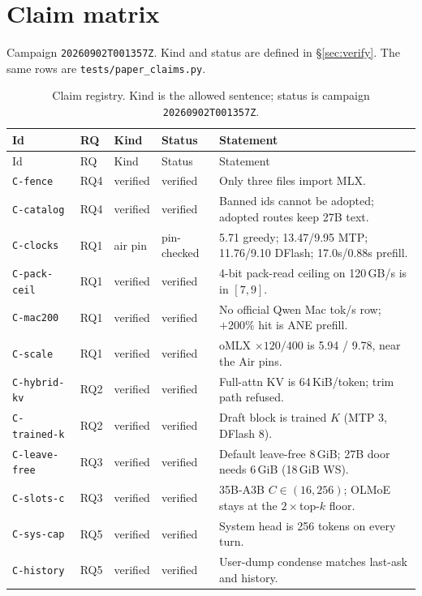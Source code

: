 \section{Claim matrix}
\label{app:claims}

Campaign \texttt{20260902T001357Z}. Kind and status are defined in \S\ref{sec:verify}. The same rows are \texttt{tests/paper\_claims.py}.

{\small
\begin{longtable}{@{}llllp{6.6cm}@{}}
\caption{Claim registry. Kind is the allowed sentence; status is campaign \texttt{20260902T001357Z}.}
\label{tab:claims}\\
\toprule
Id & RQ & Kind & Status & Statement \\
\midrule
\endfirsthead
\toprule
Id & RQ & Kind & Status & Statement \\
\midrule
\endhead
\texttt{C-fence} & RQ4 & verified & verified & Only three files import MLX. \\
\texttt{C-catalog} & RQ4 & verified & verified & Banned ids cannot be adopted; adopted routes keep 27B text. \\
\texttt{C-clocks} & RQ1 & air pin & pin-checked & 5.71 greedy; 13.47/9.95 MTP; 11.76/9.10 DFlash; 17.0s/0.88s prefill. \\
\texttt{C-pack-ceil} & RQ1 & verified & verified & 4-bit pack-read ceiling on 120\,GB/s is in $[7,9]$. \\
\texttt{C-mac200} & RQ1 & verified & verified & No official Qwen Mac tok/s row; ${+}200\%$ hit is ANE prefill. \\
\texttt{C-scale} & RQ1 & verified & verified & oMLX $\times 120/400$ is 5.94 / 9.78, near the Air pins. \\
\texttt{C-hybrid-kv} & RQ2 & verified & verified & Full-attn KV is 64\,KiB/token; trim path refused. \\
\texttt{C-trained-k} & RQ2 & verified & verified & Draft block is trained $K$ (MTP 3, DFlash 8). \\
\texttt{C-leave-free} & RQ3 & verified & verified & Default leave-free 8\,GiB; 27B door needs 6\,GiB (18\,GiB WS). \\
\texttt{C-slots-c} & RQ3 & verified & verified & 35B-A3B $C \in (16,256)$; OLMoE stays at the $2\times$top-$k$ floor. \\
\texttt{C-sys-cap} & RQ5 & verified & verified & System head is 256 tokens on every turn. \\
\texttt{C-history} & RQ5 & verified & verified & User-dump condense matches last-ask and history. \\

\end{longtable}}
